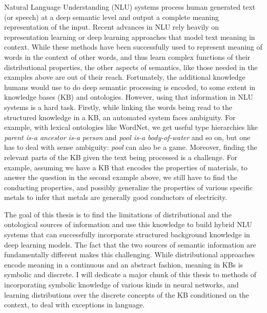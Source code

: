 Natural Language Understanding (NLU) systems process human generated text 
(or speech) at a deep semantic level and output a complete meaning representation of the input. 
Recent advances in NLU rely heavily on representation learning or deep learning
approaches that model 
text meaning in context. While these methods have been successfully used to represent meaning
of words in the context of other words, and thus learn complex functions of their distributional
properties, the other aspects of semantics, like those needed in the examples above are out of their reach.
Fortunately, the additional knowledge humans would use to do deep semantic processing is encoded, to
some extent in knowledge bases (KB) and ontologies. However, using that information in NLU systems is a 
hard task. Firstly, while linking the words being read to the structured knowledge
in a KB, an automated system faces ambiguity. For example, with lexical ontologies like WordNet, 
we get useful type hierarchies like \textit{parent is-a ancestor is-a person} and \textit{pool is-a body-of-water} 
and so on, but one has to deal with sense ambiguity: \textit{pool} can also be a game. Moreover, finding the 
relevant parts of the KB given the text being processed is a challenge. For example, assuming we have a KB that encodes
the properties of materials, to answer the question in the second example above, we still have to 
find the conducting properties, and possibly generalize the properties of various specific metals to
infer that metals are generally good conductors of electricity.


The goal of this thesis is to find the limitations of distributional and the ontological 
sources of information and use this knowledge to build hybrid NLU systems that can successfully 
incorporate structured background knowledge in deep learning models. The fact
that the two sources of semantic information are fundamentally different 
makes this challenging. While distributional approaches encode meaning in a
continuous and an abstract fashion, meaning in KBs is symbolic and discrete. 
I will dedicate a major chunk of this thesis to methods of incorporating
symbolic knowledge of various kinds in neural networks, and learning 
distributions over the discrete concepts of the KB conditioned on the context,
to deal with exceptions in language.


